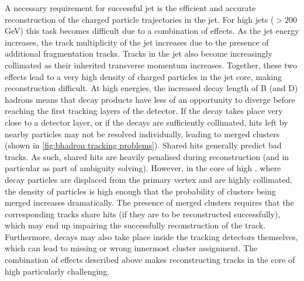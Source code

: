 A necessary requirement for successful jet \btagging is the efficient and accurate reconstruction of the charged particle trajectories in the jet. For high \pT jets (\pT $> 200$ GeV) this task becomes difficult due to a combination of effects. As the jet energy increases, the track multiplicity of the jet increases due to the presence of additional fragmentation tracks. Tracks in the jet also become increasingly collimated as their inherited transverse momentum increases. Together, these two effects lead to a very high density of charged particles in the jet core, making reconstruction difficult. At high energies, the increased decay length of B (and D) hadrons means that decay products have less of an opportunity to diverge before reaching the first tracking layers of the detector. If the decay takes place very close to a detector layer, or if the decays are sufficiently collimated, hits left by nearby particles may not be resolved individually, leading to merged clusters (shown in \cref{fig:bhadron tracking problems}). Shared hits generally predict bad tracks. As such, shared hits are heavily penalised during reconstruction (and in particular as part of ambiguity solving). However, in the core of high \pT \bjets, where decay particles are displaced from the primary vertex and are highly collimated, the density of particles is high enough that the probability of clusters being merged increases dramatically. The presence of merged clusters requires that the corresponding tracks share hits (if they are to be reconstructed successfully), which may end up impairing the successfully reconstruction of the track. Furthermore, decays may also take place inside the tracking detectors themselves, which can lead to missing or wrong innermost cluster assignment. The combination of effects described above makes reconstructing tracks in the core of high \pT \bjets particularly challenging.


